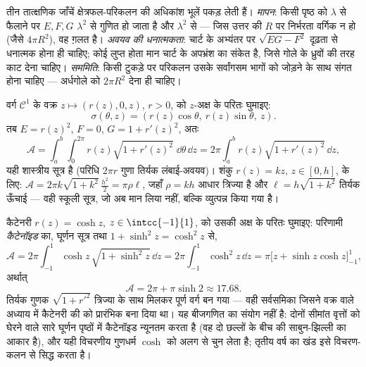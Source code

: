 \begin{remark}[क्षेत्रफलों के लिए त्वरित जाँचें]
तीन तात्क्षणिक जाँचें क्षेत्रफल-परिकलन की अधिकांश भूलें पकड़ लेती
हैं। \emph{मापन}: किसी पृष्ठ को $\lambda$ से फैलाने पर $E, F, G$ $\lambda^2$ से
गुणित हो जाता है और  $\lambda^2$ से --- जिस उत्तर की $R$ पर
निर्भरता वर्गिक न हो (जैसे $4\pi R^2$), वह ग़लत है।
\emph{अवयव की धनात्मकता}: चार्ट के अभ्यंतर पर $\sqrt{EG - F^2}$ दृढ़ता से
धनात्मक होना ही चाहिए; कोई लुप्त होता मान चार्ट के अपभ्रंश का संकेत
है, जिसे गोले के ध्रुवों की तरह काट देना चाहिए। \emph{सममिति}: किसी
 टुकड़े पर परिकलन उसके सर्वांगसम भागों को जोड़ने के साथ संगत
होना चाहिए --- अर्धगोले को $2\pi R^2$ देना ही चाहिए।
\end{remark}

\begin{example}[घूर्णन पृष्ठ]\label{ex:b2:surfaces:revolution}
वर्ग $\mathcal{C}^1$ के वक्र $z \mapsto (r(z), 0, z)$, $r > 0$, को $z$-अक्ष के परितः घुमाइए:
\[
\sigma(\theta, z) = (r(z)\cos\theta,\ r(z)\sin\theta,\ z).
\]
तब $E = r(z)^2$, $F = 0$, $G = 1 + r'(z)^2$, अतः
\[
\mathcal{A} = \int_a^b\!\!\int_0^{2\pi}
r(z)\sqrt{1 + r'(z)^2}\;\dd\theta\,\dd z
= 2\pi\int_a^b r(z)\sqrt{1 + r'(z)^2}\,\dd z ,
\]
यही शास्त्रीय सूत्र है (परिधि $2\pi r$ गुणा तिर्यक लंबाई-अवयव)। शंकु
$r(z) = kz$, $z \in [0, h]$, के लिए: $\mathcal
A = 2\pi k\sqrt{1 + k^2}\,\frac{h^2}{2} = \pi \rho \ell$, जहाँ $\rho = kh$ आधार त्रिज्या है और
$\ell = h\sqrt{1 + k^2}$ तिर्यक ऊँचाई --- वही स्कूली सूत्र, जो अब मान लिया नहीं, बल्कि
व्युत्पन्न किया गया है।
\end{example}

\begin{example}[कैटेनॉइड]\label{ex:b2:surfaces:catenoid}
कैटेनरी $r(z) = \cosh z$, $z \in \intcc{-1}{1}$, को उसकी अक्ष के परितः घुमाइए: परिणामी
\emph{कैटेनॉइड} का, घूर्णन सूत्र तथा $1 + \sinh^2 z = \cosh^2 z$ से,
\[
\mathcal A = 2\pi\int_{-1}^1\cosh z\,\sqrt{1 + \sinh^2z}\,
\dd z = 2\pi\int_{-1}^1\cosh^2z\,\dd z
= \pi\bigl[z + \sinh z\cosh z\bigr]_{-1}^{1},
\]
अर्थात्
\[
\mathcal A = 2\pi + \pi\sinh 2 \approx 17.68 .
\]
तिर्यक गुणक $\sqrt{1 + r'^2}$ त्रिज्या के साथ मिलकर पूर्ण वर्ग बन गया --- वही
सर्वसमिका जिसने वक्र वाले अध्याय में कैटेनरी की  को
प्रारंभिक बना दिया था। यह बीजगणित का संयोग नहीं है: दोनों सीमांत
वृत्तों को घेरने वाले सारे घूर्णन पृष्ठों में कैटेनॉइड 
न्यूनतम करता है (वह दो छल्लों के बीच की साबुन-झिल्ली का आकार है), और
यही विचरणीय गुणधर्म $\cosh$ को अलग से चुन लेता है; तृतीय वर्ष का खंड
इसे विचरण-कलन से सिद्ध करता है।
\end{example}

